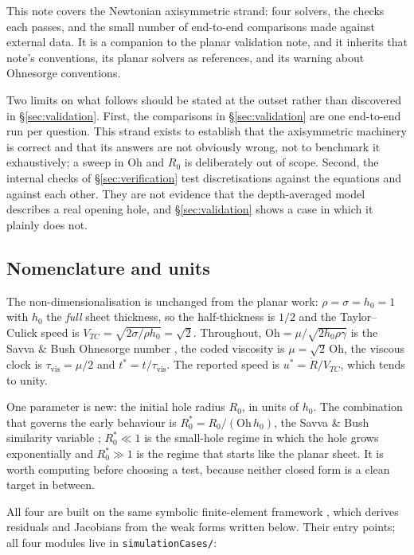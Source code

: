 \documentclass[11pt,a4paper]{article}
\newcommand{\Oh}{\mathrm{Oh}}
\newcommand{\Vtc}{V_{TC}}
\begin{document}
This note covers the Newtonian axisymmetric strand: four solvers, the checks
each passes, and the small number of end-to-end comparisons made against
external data. It is a companion to the planar validation note, and it inherits
that note's conventions, its planar solvers as references, and its warning
about Ohnesorge conventions.

Two limits on what follows should be stated at the outset rather than
discovered in \S\ref{sec:validation}. First, the comparisons in
\S\ref{sec:validation} are one end-to-end run per question. This strand exists
to establish that the axisymmetric machinery is correct and that its answers
are not obviously wrong, not to benchmark it exhaustively; a sweep in
$\Oh$ and $R_{0}$ is deliberately out of scope. Second, the internal checks
of \S\ref{sec:verification} test discretisations against the equations and
against each other. They are not evidence that the depth-averaged model
describes a real opening hole, and \S\ref{sec:validation} shows a case in which
it plainly does not.

\subsection{Nomenclature and units}

The non-dimensionalisation is unchanged from the planar work: $\rho = \sigma =
h_{0} = 1$ with $h_{0}$ the \emph{full} sheet thickness, so the half-thickness
is $1/2$ and the Taylor--Culick speed \cite{taylor1959,culick1960} is
$\Vtc = \sqrt{2\sigma/\rho h_{0}} = \sqrt{2}$. Throughout, $\Oh =
\mu/\sqrt{2 h_{0}\rho\gamma}$ is the Savva \& Bush Ohnesorge number
\cite{savva2009}, the coded viscosity is $\mu = \sqrt{2}\,\Oh$, the viscous
clock is $\tau_{\mathrm{vis}} = \mu/2$ and $t^{*} = t/\tau_{\mathrm{vis}}$. The
reported speed is $u^{*} = \dot{R}/\Vtc$, which tends to unity.

One parameter is new: the initial hole radius $R_{0}$, in units of $h_{0}$.
The combination that governs the early behaviour is
$R_{0}^{*} = R_{0}/(\Oh\,h_{0})$, the Savva \& Bush similarity variable
\cite{savva2009}; $R_{0}^{*}\ll 1$ is the small-hole regime in which the hole
grows exponentially and $R_{0}^{*}\gg 1$ is the regime that starts like the
planar sheet. It is worth computing before choosing a test, because neither
closed form is a clean target in between.

All four are built on the same symbolic finite-element framework
\cite{diddens2023}, which derives residuals and Jacobians from the weak forms
written below. Their entry points; all four modules live in
\texttt{simulationCases/}:
\end{document}
